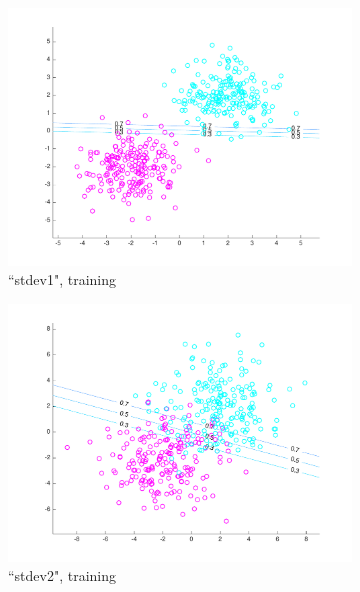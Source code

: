 \begin{figure}[h!]
\centering
    \begin{subfigure}[b]{0.22\textwidth}
	\includegraphics[scale=0.25]{hw2_1_stdev1_a_100.pdf}
	\caption{``stdev1", training}\label{fig:data_stdev1_a_100}
    \end{subfigure}
    \quad
    \begin{subfigure}[b]{0.22\textwidth}
	\includegraphics[scale=0.25]{hw2_1_stdev2_a_100.pdf}
	\caption{``stdev2", training}\label{fig:data_stdev2_a_100}
	\end{subfigure}
	\quad	    
    \begin{subfigure}[b]{0.22\textwidth}

\end{subfigure}
\end{figure}
